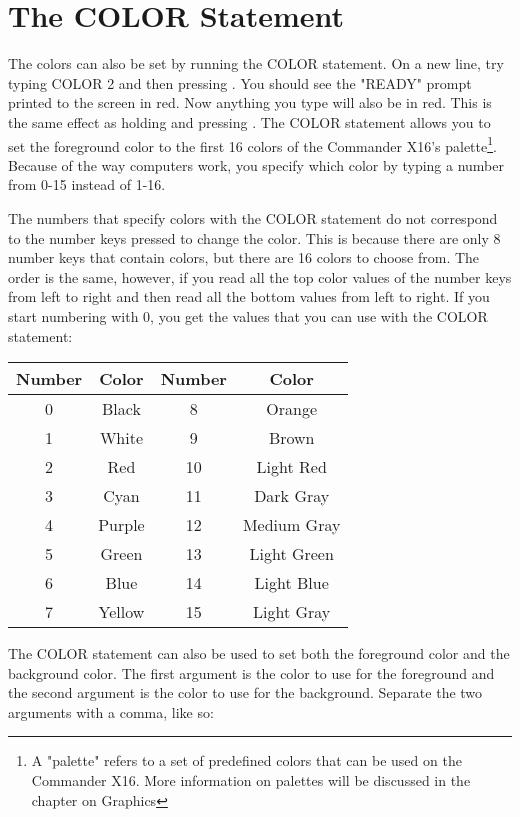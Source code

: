 \section{The COLOR Statement}

The colors can also be set by running the {\ttfamily COLOR} statement.  On a
new line, try typing {\ttfamily COLOR 2} and then pressing \returnkey.  You
should see the "READY" prompt printed to the screen in red.  Now anything you
type will also be in red.  This is the same effect as holding \ctrlkey and
pressing .  The {\ttfamily COLOR} statement allows you to set the
foreground color to the first 16 colors of the Commander X16's
palette\footnote{A "palette" refers to a set of predefined colors that can be
used on the Commander X16.  More information on palettes will be discussed in
the chapter on Graphics}.  Because of the way computers work, you specify which
color by typing a number from 0-15 instead of 1-16.

The numbers that specify colors with the {\ttfamily COLOR} statement do not
correspond to the number keys pressed to change the color.  This is because
there are only 8 number keys that contain colors, but there are 16 colors to
choose from.  The order is the same, however, if you read all the top color
values of the number keys from left to right and then read all the bottom
values from left to right.  If you start numbering with 0, you get the values
that you can use with the {\ttfamily COLOR} statement:\\

\begin{tabular}{|c|c|c|c|}
	\hline
	Number & Color & Number & Color\\ \hline
	0 & Black & 8 & Orange \\ \hline
	1 & White & 9 & Brown \\ \hline
	2 & Red & 10 & Light Red \\ \hline
	3 & Cyan & 11 & Dark Gray\\ \hline
	4 & Purple & 12 & Medium Gray\\ \hline
	5 & Green & 13 & Light Green\\ \hline
	6 & Blue & 14 & Light Blue\\ \hline
	7 & Yellow & 15 & Light Gray\\ \hline
\end{tabular}

\vspace{16pt}

The {\ttfamily COLOR} statement can also be used to set both the foreground
color and the background color.  The first argument is the color to use for the
foreground and the second argument is the color to use for the background.
Separate the two arguments with a comma, like so:\\

